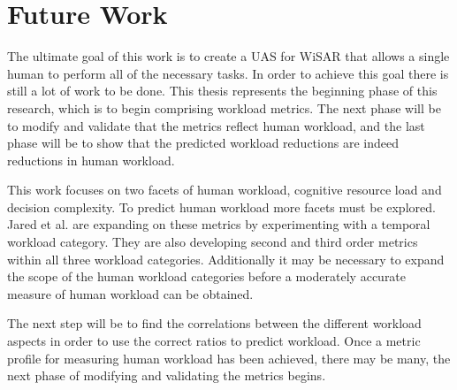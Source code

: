 \section{Future Work}

The ultimate goal of this work is to create a UAS for WiSAR that allows a single human to perform all of the necessary tasks.  In order to achieve this goal there is still a lot of work to be done.  This thesis represents the beginning phase of this research, which is to begin comprising workload metrics.  The next phase will be to modify and validate that the metrics reflect human workload, and the last phase will be to show that the predicted workload reductions are indeed reductions in human workload.

This work focuses on two facets of human workload, cognitive resource load and decision complexity.  To predict human workload more facets must be explored.  Jared et al. \cite{moore2014modeling} are expanding on these metrics by experimenting with a temporal workload category\cite{moore2014modeling}.  They are also developing second and third order metrics within all three workload categories.  Additionally it may be necessary to expand the scope of the human workload categories before a moderately accurate measure of human workload can be obtained.

The next step will be to find the correlations between the different workload aspects in order to use the correct ratios to predict workload.  Once a metric profile for measuring human workload has been achieved, there may be many, the next phase of modifying and validating the metrics begins.



